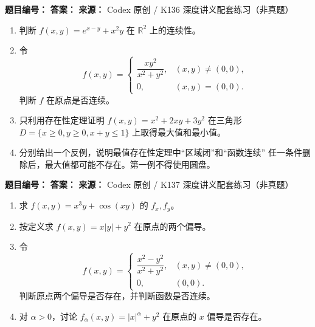 \begin{problemBox}
\begin{problemMeta}
\textbf{题目编号：}  \quad
\textbf{答案：}  \quad
\textbf{来源：} Codex 原创 / K136 深度讲义配套练习（非真题）
\end{problemMeta}
\begin{enumerate}
\item[\textbf{A}] 判断 \(f(x,y)=e^{x-y}+x^2y\) 在 \(\mathbb R^2\) 上的连续性。
\item[\textbf{B}] 令
\[
f(x,y)=
\begin{cases}
\dfrac{xy^2}{x^2+y^2},&(x,y)\ne(0,0),\\
0,&(x,y)=(0,0).
\end{cases}
\]
判断 \(f\) 在原点是否连续。
\item[\textbf{C}] 只利用存在性定理证明
\(f(x,y)=x^2+2xy+3y^2\) 在三角形
\(D=\{x\ge0,y\ge0,x+y\le1\}\) 上取得最大值和最小值。
\item[\textbf{M}] 分别给出一个反例，说明最值存在性定理中“区域闭”和“函数连续”
任一条件删除后，最大值都可能不存在。第一例不得使用圆盘。
\end{enumerate}
\end{problemBox}

\begin{problemBox}
\begin{problemMeta}
\textbf{题目编号：}  \quad
\textbf{答案：}  \quad
\textbf{来源：} Codex 原创 / K137 深度讲义配套练习（非真题）
\end{problemMeta}
\begin{enumerate}
\item[\textbf{A}] 求 \(f(x,y)=x^3y+\cos(xy)\) 的 \(f_x,f_y\)。
\item[\textbf{B}] 按定义求 \(f(x,y)=x|y|+y^2\) 在原点的两个偏导。
\item[\textbf{C}] 令
\[
f(x,y)=
\begin{cases}
\dfrac{x^2-y^2}{x^2+y^2},&(x,y)\ne(0,0),\\
0,&(0,0).
\end{cases}
\]
判断原点两个偏导是否存在，并判断函数是否连续。
\item[\textbf{M}] 对 \(\alpha>0\)，讨论
\(f_\alpha(x,y)=|x|^\alpha+y^2\) 在原点的 \(x\) 偏导是否存在。
\end{enumerate}
\end{problemBox}

